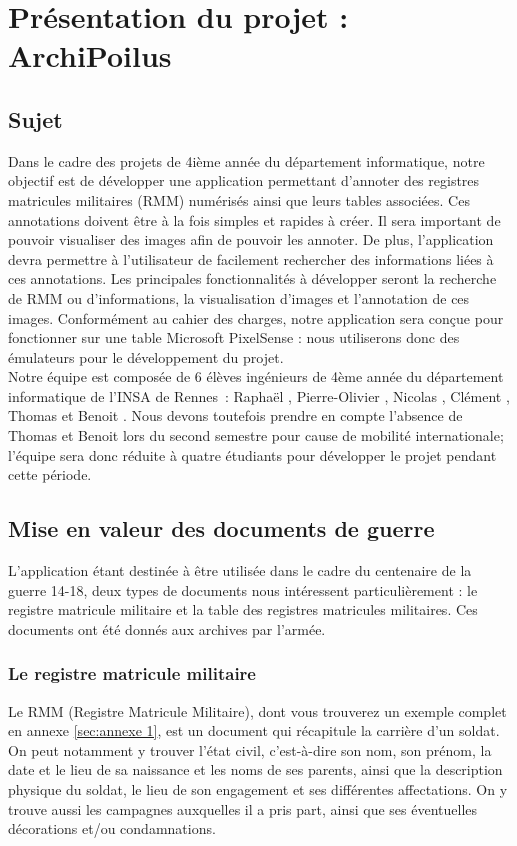 \documentclass[a4paper]{article}
\begin{document}
\newpage

\section{Présentation du projet : ArchiPoilus}

\subsection{Sujet}

	Dans le cadre des projets de 4ième année du département informatique, notre objectif est de développer une application permettant d’annoter des registres matricules militaires (RMM) numérisés ainsi que leurs tables associées. Ces annotations doivent être à la fois simples et rapides à créer. Il sera important de pouvoir visualiser des images afin de pouvoir les annoter. De plus, l’application devra permettre à l’utilisateur de facilement rechercher des informations liées à ces annotations. Les principales fonctionnalités à développer seront la recherche de RMM ou d’informations, la visualisation d’images et l’annotation de ces images. Conformément au cahier des charges, notre application sera conçue pour fonctionner sur une table Microsoft PixelSense : nous utiliserons donc des émulateurs pour le développement du projet.\\
	
	Notre équipe est composée de 6 élèves ingénieurs de 4ème année du département informatique de l’INSA de Rennes : Raphaël , Pierre-Olivier , Nicolas , Clément , Thomas  et Benoit . Nous devons toutefois prendre en compte l’absence de Thomas et Benoit lors du second semestre pour cause de mobilité internationale; l’équipe sera donc réduite à quatre étudiants pour développer le projet pendant cette période.

\subsection{Mise en valeur des documents de guerre}

	L'application étant destinée à être utilisée dans le cadre du centenaire de la guerre 14-18, deux types de documents nous intéressent particulièrement : le registre matricule militaire et la table des registres matricules militaires. Ces documents ont été donnés aux archives par l'armée.

\subsubsection{Le registre matricule militaire}
	Le RMM (Registre Matricule Militaire), dont vous trouverez un exemple complet en annexe \ref{sec:annexe 1}, est un document qui récapitule la carrière d'un soldat. On peut notamment y trouver l'état civil, c'est-à-dire son nom, son prénom, la date et le lieu de sa naissance et les noms de ses parents, ainsi que la description physique du soldat, le lieu de son engagement et ses différentes affectations. On y trouve aussi les campagnes auxquelles il a pris part, ainsi que ses éventuelles décorations et/ou condamnations.
\end{document}
